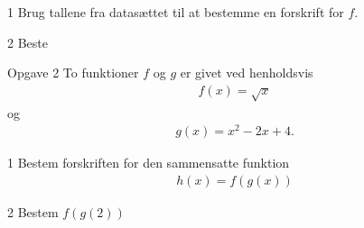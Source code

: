 \documentclass[12pt,x11names,a4paper]{article}
\begin{document}
\begin{delopgave}{}{1}
	Brug tallene fra datasættet til at bestemme en forskrift for $f$. 
\end{delopgave}
\begin{delopgave}{}{2}
	Beste
\end{delopgave}
\begin{opgavetekst}{Opgave 2}
	To funktioner $f$ og $g$ er givet ved henholdsvis
	\begin{align*}
		f(x) = \sqrt{x}
	\end{align*}
	og
	\begin{align*}
		g(x) = x^2-2x+4.
	\end{align*}
\end{opgavetekst}
\begin{delopgave}{}{1}
	Bestem forskriften for den sammensatte funktion
	\begin{align*}
		h(x) = f(g(x))
	\end{align*}
\end{delopgave}
\begin{delopgave}{}{2}
	Bestem $f(g(2))$
\end{delopgave}
\end{document}
